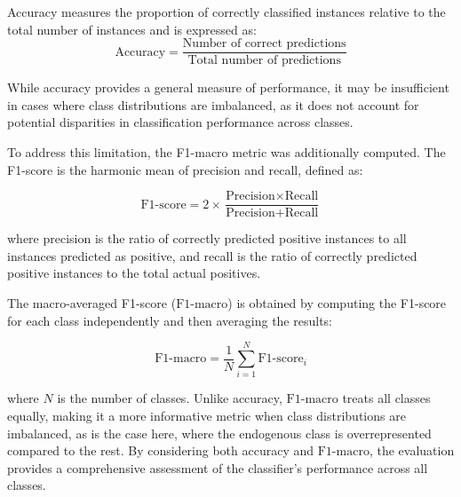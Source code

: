 \documentclass{article}
\begin{document}
Accuracy measures the proportion of correctly classified instances relative to the total number of instances and is expressed as:
\[
\text{Accuracy} = \frac{\text{Number of correct predictions}}{\text{Total number of predictions}}
\]

While accuracy provides a general measure of performance, it may be insufficient in cases where class distributions are imbalanced, as it does not account for potential disparities in classification performance across classes.

To address this limitation, the F1-macro metric was additionally computed. The F1-score is the harmonic mean of precision and recall, defined as:

\[
\text{F1-score} = 2 \times \frac{\text{Precision} \times \text{Recall}}{\text{Precision} + \text{Recall}}
\]

where precision is the ratio of correctly predicted positive instances to all instances predicted as positive, and recall is the ratio of correctly predicted positive instances to the total actual positives. 

The macro-averaged F1-score (\(\text{F1-macro}\)) is obtained by computing the F1-score for each class independently and then averaging the results:

\[
\text{F1-macro} = \frac{1}{N} \sum_{i=1}^{N} \text{F1-score}_i
\]

where \(N\) is the number of classes. Unlike accuracy, \(\text{F1-macro}\) treats all classes equally, making it a more informative metric when class distributions are imbalanced, as is the case here, where the endogenous class is overrepresented compared to the rest. By considering both accuracy and \(\text{F1-macro}\), the evaluation provides a comprehensive assessment of the classifier’s performance across all classes.
\end{document}
